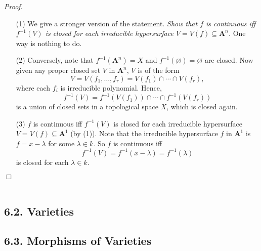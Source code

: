 \documentclass{article}
\begin{document}
\emph{Proof.}
\begin{enumerate}
\item[(1)]
  We give a stronger version of the statement.
  \emph{Show that $f$ is continuous iff
  $f^{-1}(V)$ is closed for each irreducible hypersurface $V = V(f) \subseteq \mathbf{A}^{n}$.}
  One way is nothing to do.

\item[(2)]
  Conversely,
  note that $f^{-1}(\mathbf{A}^{n}) = X$ and $f^{-1}(\varnothing) = \varnothing$ are closed.
  Now given any proper closed set $V$ in $\mathbf{A}^{n}$,
  $V$ is of the form
  \[
    V = V(f_1, \ldots, f_r) = V(f_1) \cap \cdots \cap V(f_r),
  \]
  where each $f_i$ is irreducible polynomial.
  Hence,
  \[
    f^{-1}(V) = f^{-1}(V(f_1)) \cap \cdots \cap f^{-1}(V(f_r))
  \]
  is a union of closed sets in a topological space $X$, which is closed again.

\item[(3)]
  $f$ is continuous iff
  $f^{-1}(V)$ is closed for each irreducible hypersurface $V = V(f) \subseteq \mathbf{A}^{1}$
  (by (1)).
  Note that the irreducible hypersurface $f$ in $\mathbf{A}^{1}$ is
  $f = x - \lambda$ for some $\lambda \in k$.
  So $f$ is continuous iff
  \[
    f^{-1}(V) = f^{-1}(x - \lambda) = f^{-1}(\lambda)
  \]
  is closed for each $\lambda \in k$.
\end{enumerate}
$\Box$ \\\\






\subsection*{6.2. Varieties \\}






\subsection*{6.3. Morphisms of Varieties \\}
\end{document}
